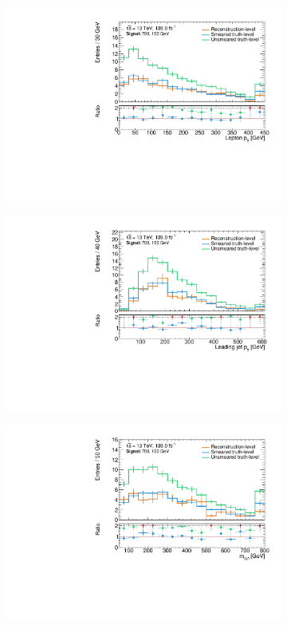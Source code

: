 \begin{figure}
\begin{subfigure}[b]{0.45\linewidth}
		\centering\includegraphics[width=\textwidth]{20210324/700_150/lep1Pt_C1N2_Wh_hbb_700p0_150p0_smeared.pdf}
	\end{subfigure}\hfill
	\begin{subfigure}[b]{0.45\linewidth}
		\centering\includegraphics[width=\textwidth]{20210324/700_150/jet1Pt_C1N2_Wh_hbb_700p0_150p0_smeared.pdf}
	\end{subfigure}\hfill
	\begin{subfigure}[b]{0.45\linewidth}
		\centering\includegraphics[width=\textwidth]{20210324/700_150/mlb1_C1N2_Wh_hbb_700p0_150p0_smeared.pdf}

\end{subfigure}
\end{figure}
